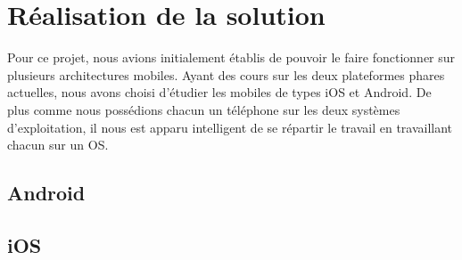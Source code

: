 \cleardoublepage



\chapter{Réalisation de la solution}

Pour ce projet, nous avions initialement établis de pouvoir le faire fonctionner sur plusieurs 
architectures mobiles. Ayant des cours sur les deux plateformes phares actuelles, nous avons choisi
d'étudier les mobiles de types iOS et Android. De plus comme nous possédions chacun un téléphone 
sur les deux systèmes d'exploitation, il nous est apparu intelligent de se répartir le travail en 
travaillant chacun sur un OS.
\\






\section{Android}








\section{iOS}

